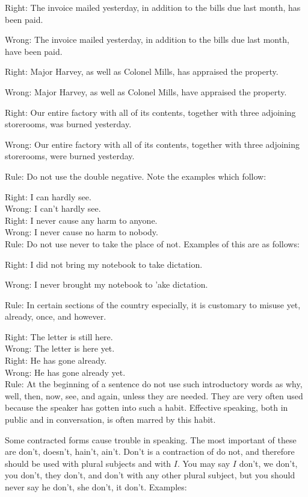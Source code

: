 \documentclass[10pt]{article}
\begin{document}
Right: The invoice mailed yesterday, in addition to the bills due last month, has been paid.

Wrong: The invoice mailed yesterday, in addition to the bills due last month, have been paid.

Right: Major Harvey, as well as Colonel Mills, has appraised the property.

Wrong: Major Harvey, as well as Colonel Mills, have appraised the property.

Right: Our entire factory with all of its contents, together with three adjoining storerooms, was burned yesterday.

Wrong: Our entire factory with all of its contents, together with three adjoining storerooms, were burned yesterday.

Rule: Do not use the double negative. Note the examples which follow:

Right: I can hardly see.\\
Wrong: I can't hardly see.\\
Right: I never cause any harm to anyone.\\
Wrong: I never cause no harm to nobody.\\
Rule: Do not use never to take the place of not. Examples of this are as follows:

Right: I did not bring my notebook to take dictation.

Wrong: I never brought my notebook to 'ake dictation.

Rule: In certain sections of the country especially, it is customary to misuse yet, already, once, and however.

Right: The letter is still here.\\
Wrong: The letter is here yet.\\
Right: He has gone already.\\
Wrong: He has gone already yet.\\
Rule: At the beginning of a sentence do not use such introductory words as why, well, then, now, see, and again, unless they are needed. They are very often used because the speaker has gotten into such a habit. Effective speaking, both in public and in conversation, is often marred by this habit.

Some contracted forms cause trouble in speaking. The most important of these are don't, doesn't, hain't, ain't. Don't is a contraction of do not, and therefore should be used with plural subjects and with $I$. You may say $I$ don't, we don't, you don't, they don't, and don't with any other plural subject, but you should never say he don't, she don't, it don't. Examples:
\end{document}
